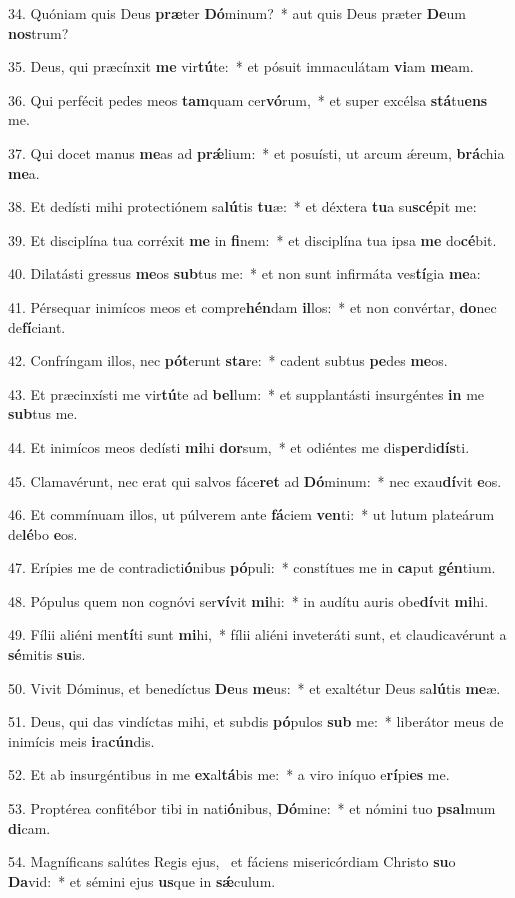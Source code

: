 34. Quóniam quis Deus \textbf{præ}ter \textbf{Dó}minum?~*  aut quis Deus præter \textbf{De}um \textbf{nos}trum?\

35. Deus, qui præcínxit \textbf{me} vir\textbf{tú}te:~*  et pósuit immaculátam \textbf{vi}am \textbf{me}am.\

36. Qui perfécit pedes meos \textbf{tam}quam cer\textbf{vó}rum,~*  et super excélsa \textbf{stá}tu\textbf{ens} me.\

37. Qui docet manus \textbf{me}as ad \textbf{prǽ}lium:~*  et posuísti, ut arcum ǽreum, \textbf{brá}chia \textbf{me}a.\

38. Et dedísti mihi protectiónem sa\textbf{lú}tis \textbf{tu}æ:~*  et déxtera \textbf{tu}a su\textbf{scé}pit me:\

39. Et disciplína tua corréxit \textbf{me} in \textbf{fi}nem:~*  et disciplína tua ipsa \textbf{me} do\textbf{cé}bit.\

40. Dilatásti gressus \textbf{me}os \textbf{sub}tus me:~*  et non sunt infirmáta ves\textbf{tí}gia \textbf{me}a:\

41. Pérsequar inimícos meos et compre\textbf{hén}dam \textbf{il}los:~*  et non convértar, \textbf{do}nec de\textbf{fí}ciant.\

42. Confríngam illos, nec \textbf{pót}erunt \textbf{sta}re:~*  cadent subtus \textbf{pe}des \textbf{me}os.\

43. Et præcinxísti me vir\textbf{tú}te ad \textbf{bel}lum:~*  et supplantásti insurgéntes \textbf{in} me \textbf{sub}tus me.\

44. Et inimícos meos dedísti \textbf{mi}hi \textbf{dor}sum,~*  et odiéntes me dis\textbf{per}di\textbf{dís}ti.\

45. Clamavérunt, nec erat qui salvos fáce\textbf{ret} ad \textbf{Dó}minum:~*  nec exau\textbf{dí}vit \textbf{e}os.\

46. Et commínuam illos, ut púlverem ante \textbf{fá}ciem \textbf{ven}ti:~*  ut lutum plateárum de\textbf{lé}bo \textbf{e}os.\

47. Erípies me de contradicti\textbf{ó}nibus \textbf{pó}puli:~*  constítues me in \textbf{ca}put \textbf{gén}tium.\

48. Pópulus quem non cognóvi ser\textbf{ví}vit \textbf{mi}hi:~*  in audítu auris obe\textbf{dí}vit \textbf{mi}hi.\

49. Fílii aliéni men\textbf{tí}ti sunt \textbf{mi}hi,~*  fílii aliéni inveteráti sunt, et claudicavérunt a \textbf{sé}mitis \textbf{su}is.\

50. Vivit Dóminus, et benedíctus \textbf{De}us \textbf{me}us:~*  et exaltétur Deus sa\textbf{lú}tis \textbf{me}æ.\

51. Deus, qui das vindíctas mihi, et subdis \textbf{pó}pulos \textbf{sub} me:~*  liberátor meus de inimícis meis \textbf{i}ra\textbf{cún}dis.\

52. Et ab insurgéntibus in me \textbf{ex}al\textbf{tá}bis me:~*  a viro iníquo e\textbf{rí}pi\textbf{es} me.\

53. Proptérea confitébor tibi in nati\textbf{ó}nibus, \textbf{Dó}mine:~*  et nómini tuo \textbf{psal}mum \textbf{di}cam.\

54. Magníficans salútes Regis ejus, \dag\  et fáciens misericórdiam Christo \textbf{su}o \textbf{Da}vid:~*  et sémini ejus \textbf{us}que in \textbf{sǽ}culum.\

